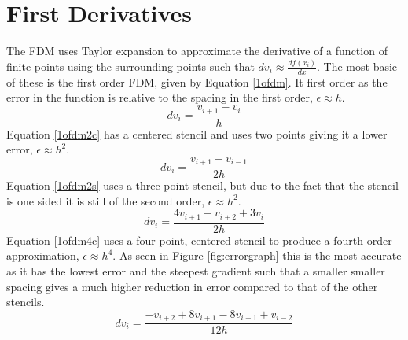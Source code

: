 \section{First Derivatives}
The FDM uses Taylor expansion to approximate the derivative of a function of finite points using the surrounding points such that $dv_i \approx \frac{df(x_i)}{dx}$.
\linebreak
\linebreak
The most basic of these is the first order FDM, given by Equation \ref{1ofdm}. It first order as the error in the function is relative to the spacing in the first order, $\epsilon \approx h$.
\begin{equation} \label{1ofdm}
  dv_i = \frac{v_{i+1} - v_i}{h}
\end{equation}
Equation \ref{1ofdm2c} has a centered stencil and uses two points giving it a lower error, $\epsilon \approx h^2$.
\begin{equation} \label{1ofdm2c}
  dv_i = \frac{v_{i+1} - v_{i-1}}{2h}
\end{equation}
Equation \ref{1ofdm2s} uses a three point stencil, but due to the fact that the stencil is one sided it is still of the second order, $\epsilon \approx h^2$.
\begin{equation} \label{1ofdm2s}
  dv_i = \frac{4v_{i+1} - v_{i+2} + 3v_i}{2h}
\end{equation}
Equation \ref{1ofdm4c} uses a four point, centered stencil to produce a fourth order approximation, $\epsilon \approx h^4$. As seen in Figure \ref{fig:errorgraph} this is the most accurate as it has the lowest error and the steepest gradient such that a smaller smaller spacing gives a much higher reduction in error compared to that of the other stencils.
\begin{equation} \label{1ofdm4c}
  dv_i = \frac{-v_{i+2} + 8v_{i+1} - 8v_{i-1} + v_{i-2}}{12h}
\end{equation}
